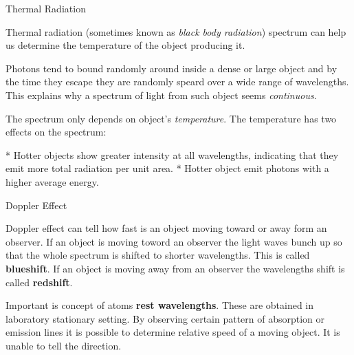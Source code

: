 \sec Thermal Radiation

Thermal radiation (sometimes known as {\em black body radiation}) spectrum can
help us determine the temperature of the object producing it.

Photons tend to bound randomly around inside a dense or large object and by
the time they escape they are randomly speard over a wide range of wavelengths.
This explains why a spectrum of light from such object seems {\em continuous}.

The spectrum only depends on object's {\em temperature}. The temperature has
two effects on the spectrum:

\begitems
* Hotter objects show greater intensity at all wavelengths, indicating that
they emit more total radiation per unit area.
* Hotter object emit photons with a higher average energy.
\enditems

\sec Doppler Effect

Doppler effect can tell how fast is an object moving toward or away form
an observer. If an object is moving toword an observer the light waves bunch
up so that the whole spectrum is shifted to shorter wavelengths. This is called
{\bf blueshift}. If an object is moving away from an observer the wavelengths
shift is called {\bf redshift}.

Important is concept of atoms {\bf rest wavelengths}. These are obtained
in laboratory stationary setting. By observing certain pattern of absorption
or emission lines it is possible to determine relative speed of a moving
object. It is unable to tell the direction.
